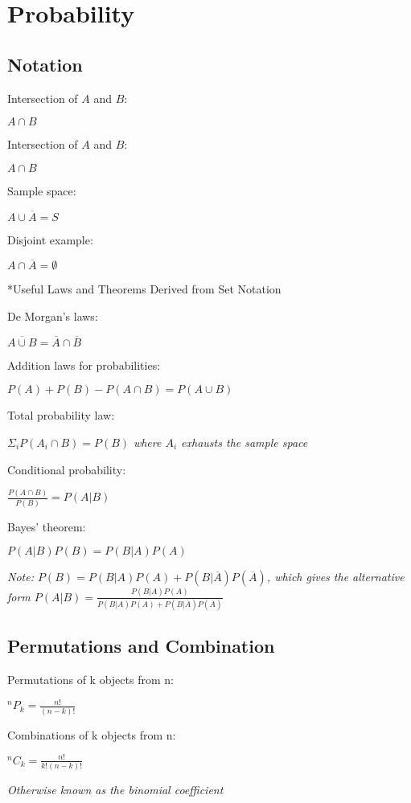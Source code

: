 \documentclass[12pt]{article}
\newcommand\textline[4][t]{%
  \par\smallskip\noindent\parbox[#1]{.35\textwidth}{\raggedright\texttt{}#2}%
  \parbox[#3]{.65\textwidth}{\raggedright\texttt{}#3}%
}
\begin{document}
\section*{Probability}

\subsection*{Notation}
\textline[t]{Intersection of $A$ and $B$:}{$A \cap B$}
\newline
\textline[t]{Intersection of $A$ and $B$:}{$A \cap B$}
\newline
\textline[t]{Sample space:}{$A \cup \overline{A} = S$}
\newline
\textline[t]{Disjoint example:}{$A \cap \overline{A} = \emptyset$}

\subsection*{Useful Laws and Theorems Derived from Set Notation}
\textline[t]{De Morgan's laws:}{$\overline{A \cup B} = \overline{A} \cap \overline{B}$}
\newline
\textline[t]{Addition laws for probabilities:}{$P(A) + P(B) - P(A \cap B) = P(A \cup B)$}
\newline
\textline[t]{Total probability law:}{$\Sigma_i P(A_i \cap B)= P(B)$ \textit{where $A_i$ exhausts the sample space}}
\newline
\textline[t]{Conditional probability:}{$\frac{P(A \cap B)}{P(B)} = P(A|B)$}
\newline
\textline[t]{Bayes' theorem:}{$P(A|B)P(B) = P(B|A)P(A)$}
\newline
\newline
\textit{Note: {\footnotesize $P(B) = P(B|A)P(A) + P(B|\overline{A})P(\overline{A})$}, which gives the alternative form $P(A|B) = \frac{P(B|A)P(A)}{P(B|A)P(A) + P(B|\overline{A})P(\overline{A})}$}

\subsection*{Permutations and Combination}
\textline[t]{Permutations of k objects from n:}{$^nP_k = \frac{n!}{(n-k)!}$}
\newline
\textline[t]{Combinations of k objects from n:}{$^nC_k = \frac{n!}{k!(n-k)!}$}
\newline
\newline
\textit{Otherwise known as the binomial coefficient}
\end{document}
